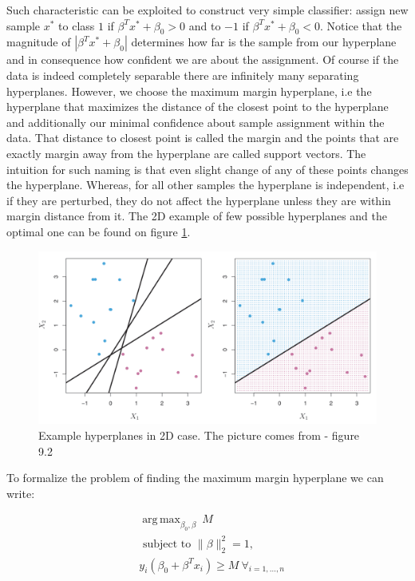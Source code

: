 \documentclass[shortabstract, english, mgr]{iithesis}
\DeclareMathOperator*{\argmax}{arg\,max}
\begin{document}
Such characteristic can be exploited to construct very simple classifier: assign new sample $x^*$ to class $1$ if $\beta^T x^* + \beta_0 > 0$ and to $-1$ if $\beta^T x^* + \beta_0 < 0$. Notice that the magnitude of $|\beta^T x^* + \beta_0|$ determines how far is the sample from our hyperplane and in consequence how confident we are about the assignment. Of course if the data is indeed completely separable there are infinitely many separating hyperplanes. However, we choose the maximum margin hyperplane, i.e the hyperplane that maximizes the distance of the closest point to the hyperplane and additionally our minimal confidence about sample assignment within the data. That distance to closest point is called the margin and the points that are exactly margin away from the hyperplane are called support vectors. The intuition for such naming is that even slight change of any of these points changes the hyperplane. Whereas, for all other samples the hyperplane is independent, i.e if they are perturbed, they do not affect the hyperplane unless they are within margin distance from it. The 2D example of few possible hyperplanes and the optimal one can be found on figure \ref{fig:svc-hyper}.

\begin{figure}
\centering
\includegraphics[width=\textwidth]{images/svc-hyper.png}
\caption{Example hyperplanes in 2D case. The picture comes from \cite{ISL} - figure 9.2}
\label{fig:svc-hyper}
\end{figure}

To formalize the problem of finding the maximum margin hyperplane we can write:

\begin{align}
&{\argmax_{\beta_{0}, \beta} \nonumber \ M} \\ &{\text { subject to } \|\beta\|_2^2 = 1}, \nonumber \\ &{y_{i}\left(\beta_{0}+\beta^T x_i\right) \geq M \ \forall_{i=1, \ldots, n}} \label{eq:svc1}
\end{align}
\end{document}

